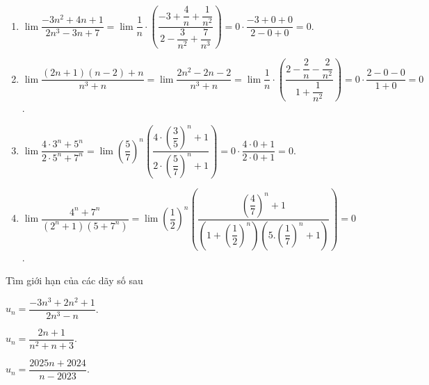 \begin{ex}
{\begin{enumerate}
			 \item $\lim \dfrac{-3n^2+4n+1}{2n^3-3n+7}=\lim \dfrac{1}{n} \cdot\left(\dfrac{-3+\dfrac{4}{n}+\dfrac{1}{n^2}}{2-\dfrac{3}{n^2}+\dfrac{7}{n^3}}\right)=0\cdot \dfrac{-3+0+0}{2-0+0}=0$.
			\item $\lim \dfrac{(2n+1)(n-2)+n}{n^3+n}=\lim \dfrac{2n^2-2n-2}{n^3+n}=\lim \dfrac{1}{n}  \cdot\left(\dfrac{2-\dfrac{2}{n}-\dfrac{2}{n^2}}{1+\dfrac{1}{n^2}}\right)=0\cdot \dfrac{2-0-0}{1+0}=0$.
			\item $\lim \dfrac{4\cdot  3^n+5^n}{2\cdot 5^n+7^n}=\lim \left(\dfrac{5}{7}\right)^n\left(\dfrac{4\cdot\left(\dfrac{3}{5}\right)^n+1}{2\cdot\left(\dfrac{5}{7}\right)^n+1}\right)=0\cdot \dfrac{4\cdot 0+1}{2\cdot 0+1}=0$.
			\item $\lim  \dfrac{4^n+7^n}{\left(2^n+1\right)\left(5+7^n\right)}=\lim \left(\dfrac{1}{2}\right)^n\left(\dfrac{\left(\dfrac{4}{7}\right)^n+1}{\left(1+\left(\dfrac{1}{2}\right)^n\right)\left(5.\left(\dfrac{1}{7}\right)^n+1\right)}\right)=0$.
		\end{enumerate}
	 }
\end{ex}

\begin{ex}%
	Tìm  giới hạn của các dãy số sau
	\begin{listEX}[3]
		\item  $u_n=\dfrac{-3n^3+2n^2+1}{2n^3-n}$.
		 \item $u_n=\dfrac{2n+1}{n^2+n+3}$.
		\item  $u_n=\dfrac{2025n+2024}{n-2023}$.
	\end{listEX}
\end{ex}


